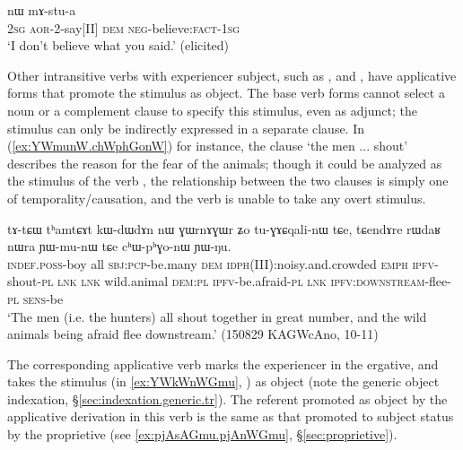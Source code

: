 \begin{exe}
\ex \label{ex:tAtWtWt.nW.mAstua}
 nɯ mɤ-stu-a \\
\textsc{2sg} \textsc{aor}-2-say[II] \textsc{dem} \textsc{neg}-believe:\textsc{fact}-\textsc{1sg} \\
\glt `I don't believe what you said.' (elicited)
\end{exe}

Other intransitive verbs with experiencer subject, such as ,  and , have applicative forms that promote the stimulus as object. The base verb forms cannot select a noun or a complement clause to specify this stimulus, even as adjunct; the stimulus can only be indirectly expressed in a separate clause. In (\ref{ex:YWmunW.chWphGonW}) for instance, the clause  `the men ... shout' describes the reason for the fear of the animals; though it could be analyzed as the stimulus of the verb , the relationship between the two clauses is simply one of temporality/causation, and the verb  is unable to take any overt stimulus.

\begin{exe}
\ex \label{ex:YWmunW.chWphGonW}
\gll  tɤ-tɕɯ tʰamtɕɤt kɯ-dɯ\redp{}dɤn nɯ ɣɯrnɤɣɯr ʑo tu-ɣɤɕqali-nɯ tɕe, tɕendɤre rɯdaʁ nɯra ɲɯ-mu-nɯ tɕe cʰɯ-pʰɣo-nɯ ɲɯ-ŋu. \\
\textsc{indef}.\textsc{poss}-boy all \textsc{sbj}:\textsc{pcp}-be.many \textsc{dem} \textsc{idph}(III):noisy.and.crowded \textsc{emph} \textsc{ipfv}-shout-\textsc{pl} \textsc{lnk} \textsc{lnk} wild.animal \textsc{dem}:\textsc{pl} \textsc{ipfv}-be.afraid-\textsc{pl} \textsc{lnk} \textsc{ipfv}:\textsc{downstream}-flee-\textsc{pl} \textsc{sens}-be \\
\glt `The men (i.e. the hunters) all shout together in great number, and the wild animals being afraid flee downstream.' (150829 KAGWcAno, 10-11)
\end{exe}

The corresponding applicative verb  marks the experiencer in the ergative, and takes the stimulus (in \ref{ex:YWkWnWGmu}, ) as object (note the generic object indexation, §\ref{sec:indexation.generic.tr}). The referent promoted as object by the applicative derivation in this verb is the same as that promoted to subject status by the proprietive  (see \ref{ex:pjAsAGmu.pjAnWGmu}, §\ref{sec:proprietive}).

